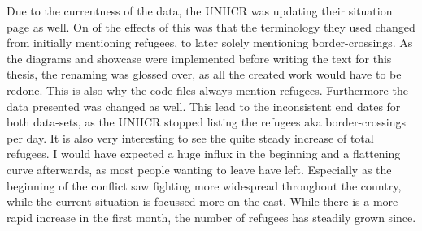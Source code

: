 Due to the currentness of the data, the UNHCR was updating their situation page as well. On of the effects of this was that the terminology they used changed from initially mentioning refugees, to later solely mentioning border-crossings. As the diagrams and showcase were implemented before writing the text for this thesis, the renaming was glossed over, as all the created work would have to be redone. This is also why the code files always mention refugees. Furthermore the data presented was changed as well. This lead to the inconsistent end dates for both data-sets, as the UNHCR stopped listing the refugees aka border-crossings per day. It is also very interesting to see the quite steady increase of total refugees. I would have expected a huge influx in the beginning and a flattening curve afterwards, as most people wanting to leave have left. Especially as the beginning of the conflict saw fighting more widespread throughout the country, while the current situation is focussed more on the east. While there is a more rapid increase in the first month, the number of refugees has steadily grown since.

